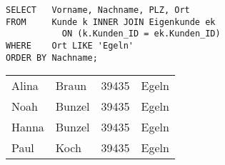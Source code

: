         \begin{lstlisting}[language=oracle_sql,caption={Join mit einschr\"ankender WHERE-Klausel und Sortierung},label=sql04_05]
SELECT   Vorname, Nachname, PLZ, Ort
FROM     Kunde k INNER JOIN Eigenkunde ek
           ON (k.Kunden_ID = ek.Kunden_ID)
WHERE    Ort LIKE 'Egeln'
ORDER BY Nachname;
        \end{lstlisting}
        \begin{center}
          \begin{small}
            \tablehead{}
            \begin{msoraclesql}
              \begin{supertabular}{llll}
                Alina & Braun & 39435 & Egeln \\
                Noah & Bunzel & 39435 & Egeln \\
                Hanna & Bunzel & 39435 & Egeln \\
                Paul & Koch & 39435 & Egeln \\
                \end{supertabular}
            \end{msoraclesql}
          \end{small}
        \end{center}
